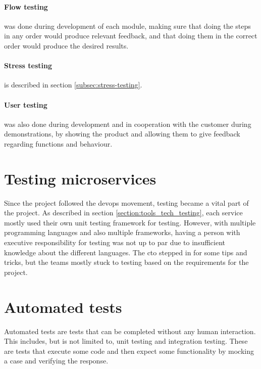 \paragraph{Flow testing} was done during development of each module, making sure that doing the steps in any order would produce relevant feedback, and that doing them in the correct order would produce the desired results.

\paragraph{Stress testing} is described in section \ref{subsec:stress-testing}.

\paragraph{User testing} was also done during development and in cooperation with the customer during demonstrations, by showing the product and allowing them to give feedback regarding functions and behaviour.



\section{Testing microservices}

Since the project followed the \acrshort{devops} movement, testing became a vital part of the project. As described in section \ref{section:tools_tech_testing}, each service mostly used their own unit testing framework for testing. However, with multiple programming languages and also multiple frameworks, having a person with executive responsibility for testing was not up to par due to insufficient knowledge about the different languages. The \acrshort{cto} stepped in for some tips and tricks, but the teams mostly stuck to testing based on the requirements for the project.


\section{Automated tests}

Automated tests are tests that can be completed without any human interaction. This includes, but is not limited to, unit testing and integration testing. These are tests that execute some code and then expect some functionality by mocking a case and verifying the response.

